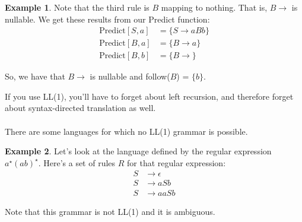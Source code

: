 \documentclass[]{article}
\theoremstyle{definition}
\newtheorem{ex}{Example}[section]
\begin{document}
\begin{ex}
					Note that the third rule is $B$ mapping to nothing. That is, $B \to$ is nullable. We get these results from our Predict function:
					\begin{align*}
						\text{Predict}[S, a] &= \{S \to aBb\} \\
						\text{Predict}[B, a] &= \{B \to a\} \\
						\text{Predict}[B, b] &= \{B \to \}
					\end{align*}

					So, we have that $B \to $ is nullable and follow($B$) = $\{b\}$.
				\end{ex}

				If you use LL(1), you'll have to forget about left recursion, and therefore forget about syntax-directed translation as well.
				\\ \\
				There are some languages for which no LL(1) grammar is possible.
				\begin{ex}
					Let's look at the language defined by the regular expression $a^\star(ab)^\star$. Here's a set of rules $R$ for that regular expression:
					\begin{align*}
						S &\to \epsilon \\
						S &\to aSb \\
						S &\to aaSb
					\end{align*}

					Note that this grammar is not LL(1) and it is ambiguous.
				\end{ex}
\end{document}
